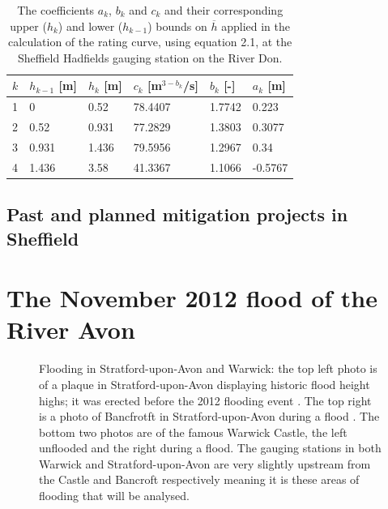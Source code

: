 \documentclass[11pt,a4paper]{article}
\begin{document}
\begin{table}[H]
\centering
\begin{tabular}{l|l|l|l|l|l}
$k$ & $h_{k-1}$ [m] & $h_k$ [m] & $c_k$ [m$^{3-b_k}$/s] & $b_k$ [-] & $a_k$ [m]\\
\hline
1 & 0 & 0.52 & 78.4407 & 1.7742 & 0.223 \\
2 & 0.52 & 0.931 & 77.2829 & 1.3803 & 0.3077 \\
3 & 0.931 & 1.436 & 79.5956 & 1.2967 & 0.34 \\
4 & 1.436 & 3.58 & 41.3367 & 1.1066 & -0.5767 \\
\end{tabular}
\caption{The coefficients $a_k$, $b_k$ and $c_k$ and their corresponding upper ($h_k$) and lower ($h_{k-1}$) bounds on $\overline{h}$ \cite{Calder-Don} applied in the calculation of the rating curve, using equation 2.1, at the Sheffield Hadfields gauging station on the River Don.}
\end{table}

\subsection{Past and planned mitigation projects in Sheffield}

\newpage
\section{The November 2012 flood of the River Avon}
\begin{figure}[H]
\centering
{}
\hfill
{}
\caption{Flooding in Stratford-upon-Avon and Warwick: the top left photo is of a plaque in Stratford-upon-Avon displaying historic flood height highs{;} it was erected before the 2012 flooding event \cite{plaque}. The top right is a photo of Bancfrotft in Stratford-upon-Avon during a flood \cite{strat-flood}. The bottom two photos are of the famous Warwick Castle, the left \cite{castle} unflooded and the right \cite{warwick-flooding} during a flood. The gauging stations in both Warwick and Stratford-upon-Avon are very slightly upstream from the Castle and Bancroft respectively meaning it is these areas of flooding that will be analysed.}
\end{figure}
\end{document}
